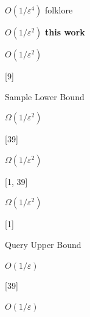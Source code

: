 \par



 





$O(1/\varepsilon^{4})$ folklore 
\par



$O(1/\varepsilon^{2})$\textbf{ this work}
 
\par



 




$O(1/\varepsilon^{2})$ 
\par


[9] 
\par



 
\par


Sample Lower Bound 




$\Omega(1/\varepsilon^{2})$ 
\par


[39] 
\par



 




$\Omega(1/\varepsilon^{2})$ 
\par


[1, 39] 
\par



 




$\Omega(1/\varepsilon^{2})$ 
\par


[1] 
\par



 
\par


Query Upper Bound 




$O(1/\varepsilon)$ 
\par


[39] 
\par



 




$O(1/\varepsilon)$ 
\par


